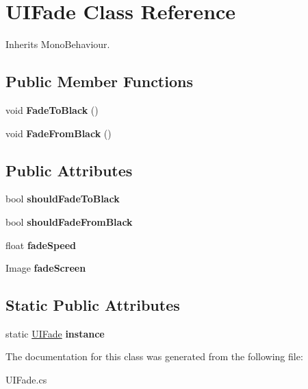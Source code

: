 \hypertarget{class_u_i_fade}{}\section{U\+I\+Fade Class Reference}
\label{class_u_i_fade}


Inherits Mono\+Behaviour.

\subsection*{Public Member Functions}
\begin{DoxyCompactItemize}
\item 
\mbox{\label{class_u_i_fade_afb35b6b40380e015c2b44ee48ff09a83}} 
void {\bfseries Fade\+To\+Black} ()
\item 
\mbox{\label{class_u_i_fade_a00e566940cec9b5b2ef3f2f11ca3ec73}} 
void {\bfseries Fade\+From\+Black} ()
\end{DoxyCompactItemize}
\subsection*{Public Attributes}
\begin{DoxyCompactItemize}
\item 
\mbox{\label{class_u_i_fade_a199626d60c1add334dfa26cd7ac72132}} 
bool {\bfseries should\+Fade\+To\+Black}
\item 
\mbox{\label{class_u_i_fade_a7c9bcb4aa63b7d229111089ede40e58b}} 
bool {\bfseries should\+Fade\+From\+Black}
\item 
\mbox{\label{class_u_i_fade_a79f663cf471530db477f3d90f9f36358}} 
float {\bfseries fade\+Speed}
\item 
\mbox{\label{class_u_i_fade_a6021c6923083f3f0938ac815e78ae8f0}} 
Image {\bfseries fade\+Screen}
\end{DoxyCompactItemize}
\subsection*{Static Public Attributes}
\begin{DoxyCompactItemize}
\item 
\mbox{\label{class_u_i_fade_ae30f0aac5bb4d5c08b29d42a017670b4}} 
static \mbox{\hyperlink{class_u_i_fade}{U\+I\+Fade}} {\bfseries instance}
\end{DoxyCompactItemize}


The documentation for this class was generated from the following file\+:\begin{DoxyCompactItemize}
\item 
U\+I\+Fade.\+cs\end{DoxyCompactItemize}
